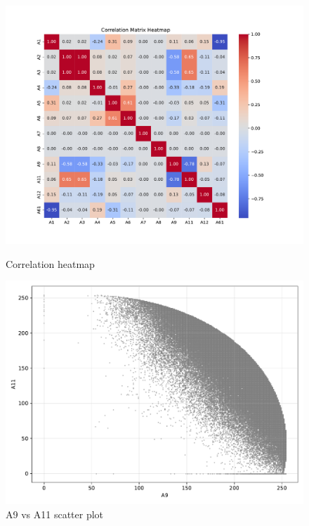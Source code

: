\documentclass[11pt]{article}
\begin{document}
\begin{figure}[H]
	\centering
	\begin{minipage}[t]{0.48\textwidth}
		\centering
		\includegraphics[width=\linewidth]{images/correlation_matrix_heatmap.pdf}
		\caption{Correlation heatmap}
		\label{fig:heatmap}
	\end{minipage}
	\hfill
	\begin{minipage}[t]{0.48\textwidth}
		\centering
		\includegraphics[width=\linewidth]{images/A9_A11_scatter.pdf}
		\caption{A9 vs A11 scatter plot}
		\label{fig:A9_A11_scatter}
	\end{minipage}
\end{figure}
\end{document}
